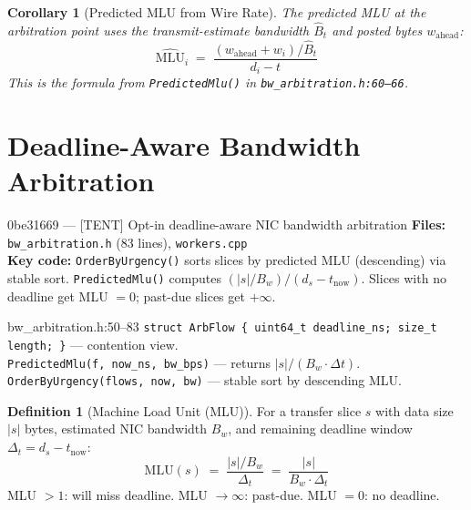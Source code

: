 \documentclass[11pt,a4paper,twoside]{article}
\theoremstyle{plain}
\newtheorem{corollary}[theorem]{Corollary}
\theoremstyle{definition}
\newtheorem{definition}[theorem]{Definition}
\theoremstyle{remark}
\begin{document}
\begin{corollary}[Predicted MLU from Wire Rate]
\label{cor:predicted-mlu}
The predicted MLU at the arbitration point uses the transmit-estimate bandwidth
$\hat{B}_t$ and posted bytes $w_{\text{ahead}}$:
\begin{equation}
  \widehat{\text{MLU}}_i \;=\;
  \frac{(w_{\text{ahead}} + w_i) / \hat{B}_t}{d_i - t}
\end{equation}
This is the formula from \texttt{PredictedMlu()} in \texttt{bw\_arbitration.h:60--66}.
\end{corollary}


\section{Deadline-Aware Bandwidth Arbitration}
\label{sec:deadline-arb}

\begin{commitbox}{0be31669 --- [TENT] Opt-in deadline-aware NIC bandwidth arbitration}
\textbf{Files:} \texttt{bw\_arbitration.h} (83 lines), \texttt{workers.cpp}\\
\textbf{Key code:} \texttt{OrderByUrgency()} sorts slices by predicted MLU
(descending) via stable sort. \texttt{PredictedMlu()} computes
$(|s|/B_w) / (d_s - t_{\text{now}})$. Slices with no deadline get MLU $= 0$;
past-due slices get $+\infty$.
\end{commitbox}

\begin{codeline}{bw\_arbitration.h:50--83}
\texttt{struct ArbFlow \{ uint64\_t deadline\_ns; size\_t length; \}} --- contention view.\\
\texttt{PredictedMlu(f, now\_ns, bw\_bps)} --- returns $|s|/(B_w \cdot \Delta t)$.\\
\texttt{OrderByUrgency(flows, now, bw)} --- stable sort by descending MLU.
\end{codeline}

\begin{definition}[Machine Load Unit (MLU)]
\label{def:mlu}
For a transfer slice $s$ with data size $|s|$ bytes, estimated NIC bandwidth $B_w$,
and remaining deadline window $\Delta_t = d_s - t_{\text{now}}$:
\begin{equation}
  \text{MLU}(s) \;=\; \frac{|s| / B_w}{\Delta_t}
  \;=\; \frac{|s|}{B_w \cdot \Delta_t}
\end{equation}
MLU $> 1$: will miss deadline. MLU $\to \infty$: past-due. MLU $= 0$: no deadline.
\end{definition}
\end{document}
